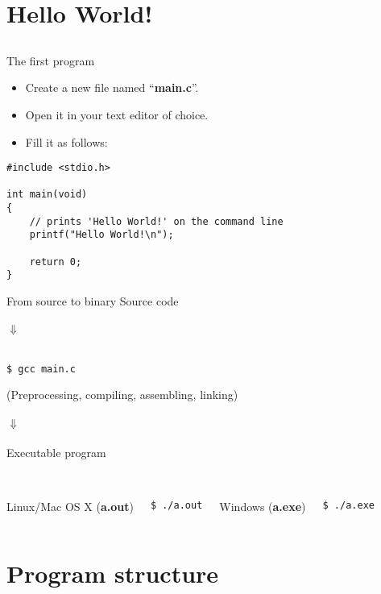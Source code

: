 \section{Hello World!}
\subsection{}
\begin{frame}[fragile]{The first program}
	\begin{itemize}
		\item Create a new file named ``\textbf{main.c}''.
		\item Open it in your text editor of choice.
		\item Fill it as follows:
	\end{itemize}
	\begin{lstlisting}
#include <stdio.h>

int main(void)
{
	// prints 'Hello World!' on the command line
	printf("Hello World!\n");

	return 0;
}
\end{lstlisting}
\end{frame}
\begin{frame}[fragile]{From source to binary}
	\centering
	Source code\\\ \\
	$\Downarrow$\\\ \\
	\begin{lstlisting}[numbers=none]
$ gcc main.c
\end{lstlisting}
(Preprocessing, compiling, assembling, linking)
	\ \\\ \\
	$\Downarrow$\\\ \\
	Executable program\\\ \\
	\begin{columns}[T]
		Linux/Mac OS X (\textbf{a.out})
		\begin{lstlisting}[numbers=none]
$ ./a.out
\end{lstlisting}
		Windows (\textbf{a.exe})
		\begin{lstlisting}[numbers=none]
$ ./a.exe
\end{lstlisting}
	\end{columns}
\end{frame}
\section{Program structure}
